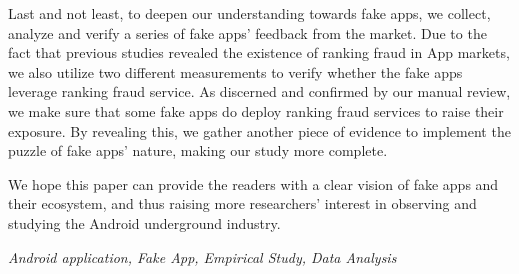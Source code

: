 Last and not least, to deepen our understanding towards fake apps, we collect, analyze and verify a series of fake apps' feedback from the market.
Due to the fact that previous studies revealed the existence of ranking fraud in App markets, we also utilize two different measurements to verify whether the fake apps leverage ranking fraud service.
As discerned and confirmed by our manual review, we make sure that some fake apps do deploy ranking fraud services to raise their exposure.
By revealing this, we gather another piece of evidence to implement the puzzle of fake apps' nature, making our study more complete.

We hope this paper can provide the readers with a clear vision of fake apps and their ecosystem, and thus raising more researchers' interest in observing and studying the Android underground industry.

{} \textit{Android application, Fake App, Empirical Study, Data Analysis}

